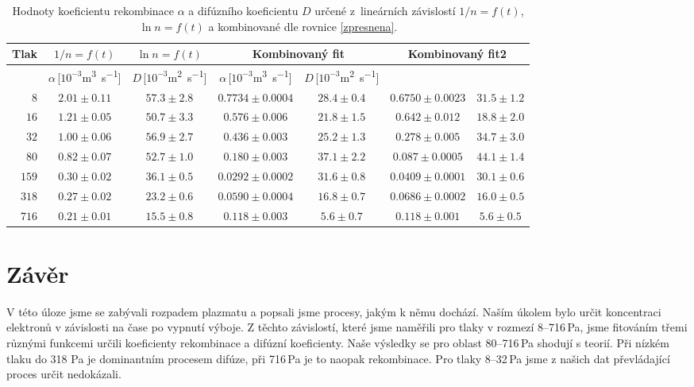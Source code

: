 \documentclass[a4paper,12pt]{article}
\begin{document}
\begin{table}[h]
	\centering
	\caption{Hodnoty koeficientu rekombinace $\alpha$ a difúzního koeficientu 
	$D$ určené z~lineárních závislostí $1/n = f(t)$, $\ln n = f(t)$ a 
	kombinované dle rovnice \eqref{zpresnena}.}
	\label{table:koef}
	\begin{tabular}{|r|c|c|c|c|c|c|}
		\hline
		Tlak & $1/n = f(t)$ & $\ln n = f(t)$ & \multicolumn{2}{c|}{Kombinovaný 
		fit} & \multicolumn{2}{c|}{Kombinovaný 
		fit2} \\ \hline
		[Pa] & 
		$\alpha$\,[$10^{-3}$\si{\meter\cubed\per\second}] & 
		$D$\,[$10^{-3}$\si{\metre^2\second^{-1}}] & 
		$\alpha$\,[$10^{-3}$\si{\meter\cubed\per\second}] & 
		$D$\,[$10^{-3}$\si{\metre^2\second^{-1}}] \\ 
		\hline
		$8$ & $2.01\pm0.11$ & $57.3\pm2.8$ & $0.7734\pm0.0004$ & $28.4\pm0.4$ & 
		$0.6750\pm0.0023$ & $31.5\pm1.2$ 
		\\ \hline
		$16$ & $1.21\pm0.05$ & $50.7\pm3.3$ & $0.576\pm0.006$ & $21.8\pm1.5$ & 
		$0.642\pm0.012$ & $18.8\pm2.0$
		\\ \hline
		$32$ & $1.00\pm0.06$ & $56.9\pm2.7$ & $0.436\pm0.003$ & $25.2\pm1.3$ & 
		$0.278\pm0.005$ & $34.7\pm3.0$
		\\ \hline
		$80$ & $0.82\pm0.07$ & $52.7\pm1.0$ & $0.180\pm0.003$ & $37.1\pm2.2$ & 
		$0.087\pm0.0005$ & $44.1\pm1.4$
		\\ \hline
		$159$ & $0.30\pm0.02$ & $36.1\pm0.5$ & $0.0292\pm0.0002$ & $31.6\pm0.8$ 
		& $0.0409\pm0.0001$ & $30.1\pm0.6$
		\\ \hline
		$318$ & $0.27\pm0.02$ & $23.2\pm0.6$ & $0.0590\pm0.0004$ & $16.8\pm0.7$ 
		& $0.0686\pm0.0002$ & $16.0\pm0.5$
		\\ \hline
		$716$ & $0.21\pm0.01$ & $15.5\pm0.8$ & $0.118\pm0.003$ & $5.6\pm0.7$ & 
		$0.118\pm0.001$ & $5.6\pm0.5$
		\\ \hline
	\end{tabular}
\end{table}
\clearpage
\section{Závěr}
V této úloze jsme se zabývali rozpadem plazmatu a popsali jsme procesy, jakým k 
němu dochází. Naším úkolem bylo určit koncentraci elektronů v závislosti na 
čase po vypnutí výboje. Z těchto závislostí, které jsme naměřili pro 
tlaky v rozmezí 8--716\,Pa, jsme fitováním třemi různými funkcemi určili 
koeficienty rekombinace a difúzní koeficienty. Naše výsledky se pro oblast 
80--716\,Pa shodují s teorií. Při nízkém tlaku do 318 Pa je dominantním 
procesem difúze, při 716\,Pa je to naopak rekombinace. Pro tlaky 8--32\,Pa jsme 
z našich dat převládající proces určit nedokázali.
\end{document}
